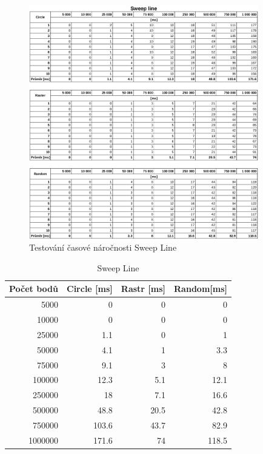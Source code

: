 \documentclass[a4paper, 12pt]{article}
\begin{document}
\begin{figure}[h!]
	\centering
	\includegraphics[width=10cm]{data_sweep_line.png}
	\caption{Testování časové náročnosti Sweep Line}
\end{figure}

\begin{table}[h!]
	\centering
	\begin{tabular}{|r|r|r|r|}
	\hline
	 \textbf{Počet bodů} 	& \textbf{Circle [ms]} & \textbf{Rastr [ms]}  & \textbf{Random[ms]} \\ \hline
	 5000 & 0 & 0 & 0   \\ \hline
	10000 & 0 & 0 & 0   \\ \hline
	25000 & 1.1 & 0 & 1  \\ \hline
	50000 & 4.1 & 1 & 3.3   \\ \hline
	75000 & 9.1 & 3 & 8  \\ \hline
	100000 & 12.3 & 5.1 & 12.1  \\ \hline
	250000 & 18 & 7.1 & 16.6   \\ \hline
	500000 & 48.8 & 20.5 & 42.8  \\ \hline
	750000 & 103.6 & 43.7 & 82.9  \\ \hline
	1000000 & 171.6 & 74 & 118.5  \\ \hline
	
	\end{tabular}
		\caption{Sweep Line}
\end{table}
\end{document}
